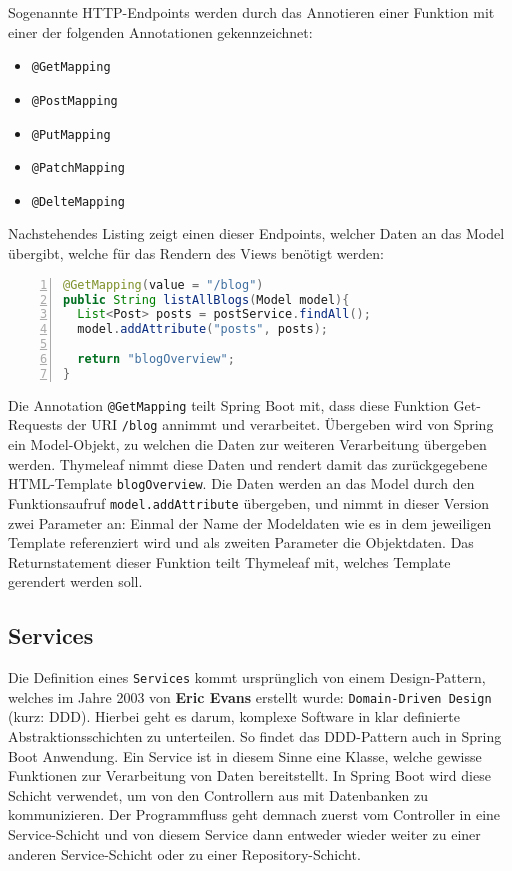 \documentclass[paper=a4,12pt]{scrreprt}
\begin{document}
Sogenannte HTTP-Endpoints werden durch das Annotieren einer Funktion mit einer der folgenden Annotationen gekennzeichnet:

\begin{itemize}
  \item \texttt{@GetMapping}
  \item \texttt{@PostMapping}
  \item \texttt{@PutMapping}
  \item \texttt{@PatchMapping}
  \item \texttt{@DelteMapping}
\end{itemize}
Nachstehendes Listing zeigt einen dieser Endpoints, welcher Daten an das Model übergibt, welche für das Rendern des Views benötigt werden:\newline

\begin{lstlisting}[caption={HTTP-Endpoint}, captionpos=b, label={listing:http_endpoint}, language=java, numbers=left,
  stepnumber=1]
@GetMapping(value = "/blog")
public String listAllBlogs(Model model){
  List<Post> posts = postService.findAll();
  model.addAttribute("posts", posts);

  return "blogOverview";
}
\end{lstlisting}

Die Annotation \texttt{@GetMapping} teilt Spring Boot mit, dass diese Funktion Get-Requests der URI \texttt{/blog} annimmt und verarbeitet. Übergeben wird von Spring ein Model-Objekt, zu welchen die Daten zur weiteren Verarbeitung übergeben werden.
Thymeleaf nimmt diese Daten und rendert damit das zurückgegebene HTML-Template \texttt{blogOverview}.\newline
Die Daten werden an das Model durch den Funktionsaufruf \texttt{model.addAttribute} übergeben, und nimmt in dieser Version zwei Parameter an: Einmal der Name der Modeldaten wie es in dem jeweiligen Template referenziert wird und als zweiten Parameter die Objektdaten.\newline
Das Returnstatement dieser Funktion teilt Thymeleaf mit, welches Template gerendert werden soll.\newline

\subsection{Services}

Die Definition eines \texttt{Services} kommt ursprünglich von einem Design-Pattern, welches im Jahre 2003 von \textbf{Eric Evans} erstellt wurde: \texttt{Domain-Driven Design} (kurz: DDD)\cite{ddd}.
Hierbei geht es darum, komplexe Software in klar definierte Abstraktionsschichten zu unterteilen. So findet das DDD-Pattern auch in Spring Boot Anwendung. Ein Service ist in diesem Sinne
eine Klasse, welche gewisse Funktionen zur Verarbeitung von Daten bereitstellt.\newline
In Spring Boot wird diese Schicht verwendet, um von den Controllern aus mit Datenbanken zu kommunizieren. Der Programmfluss geht demnach zuerst vom Controller in eine Service-Schicht und von diesem
Service dann entweder wieder weiter zu einer anderen Service-Schicht oder zu einer Repository-Schicht.\newline
\end{document}
